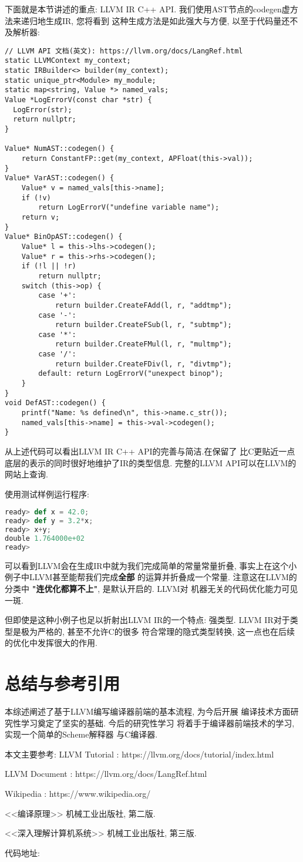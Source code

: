 \documentclass[UTF8]{ctexart}
\begin{document}
下面就是本节讲述的重点: LLVM IR C++ API.
我们使用AST节点的codegen虚方法来递归地生成IR, 您将看到
这种生成方法是如此强大与方便, 以至于代码量还不及解析器:
\begin{lstlisting}[title=IR生成, frame=shadowbox] 
// LLVM API 文档(英文): https://llvm.org/docs/LangRef.html 
static LLVMContext my_context;
static IRBuilder<> builder(my_context);
static unique_ptr<Module> my_module;
static map<string, Value *> named_vals;
Value *LogErrorV(const char *str) {
  LogError(str);
  return nullptr;
}

Value* NumAST::codegen() {
    return ConstantFP::get(my_context, APFloat(this->val));
}
Value* VarAST::codegen() {
    Value* v = named_vals[this->name];
    if (!v)
        return LogErrorV("undefine variable name");
    return v;
}
Value* BinOpAST::codegen() {
    Value* l = this->lhs->codegen();
    Value* r = this->rhs->codegen();
    if (!l || !r)
        return nullptr;
    switch (this->op) {
        case '+':
            return builder.CreateFAdd(l, r, "addtmp");
        case '-':
            return builder.CreateFSub(l, r, "subtmp");
        case '*':
            return builder.CreateFMul(l, r, "multmp");
        case '/':
            return builder.CreateFDiv(l, r, "divtmp");
        default: return LogErrorV("unexpect binop");
    }
}
void DefAST::codegen() {
    printf("Name: %s defined\n", this->name.c_str());
    named_vals[this->name] = this->val->codegen();
} 
\end{lstlisting}
从上述代码可以看出LLVM IR C++ API的完善与简洁.在保留了
比C更贴近一点底层的表示的同时很好地维护了IR的类型信息.
完整的LLVM API可以在LLVM的网站上查询. 


使用测试样例运行程序:
\begin{lstlisting}[title=测试, language=Python]
ready> def x = 42.0;
ready> def y = 3.2*x; 
ready> x+y; 
double 1.764000e+02 
ready> 
\end{lstlisting}
可以看到LLVM会在生成IR中就为我们完成简单的常量常量折叠,
事实上在这个小例子中LLVM甚至能帮我们完成\textbf{全部}
的运算并折叠成一个常量. 注意这在LLVM的分类中
\textbf{"连优化都算不上"}, 是默认开启的. LLVM对
机器无关的代码优化能力可见一斑.


但即使是这种小例子也足以折射出LLVM IR的一个特点:
强类型. LLVM IR对于类型是极为严格的, 甚至不允许C的很多
符合常理的隐式类型转换, 这一点也在后续的优化中发挥很大的作用.

\section{总结与参考引用}
本综述阐述了基于LLVM编写编译器前端的基本流程, 为今后开展
编译技术方面研究性学习奠定了坚实的基础. 今后的研究性学习
将着手于编译器前端技术的学习, 实现一个简单的Scheme解释器
与C编译器.


本文主要参考:
LLVM Tutorial : https://llvm.org/docs/tutorial/index.html


LLVM Document : https://llvm.org/docs/LangRef.html 


Wikipedia : https://www.wikipedia.org/


<<编译原理>> 机械工业出版社, 第二版.


<<深入理解计算机系统>> 机械工业出版社, 第三版.


代码地址:
\end{document}
